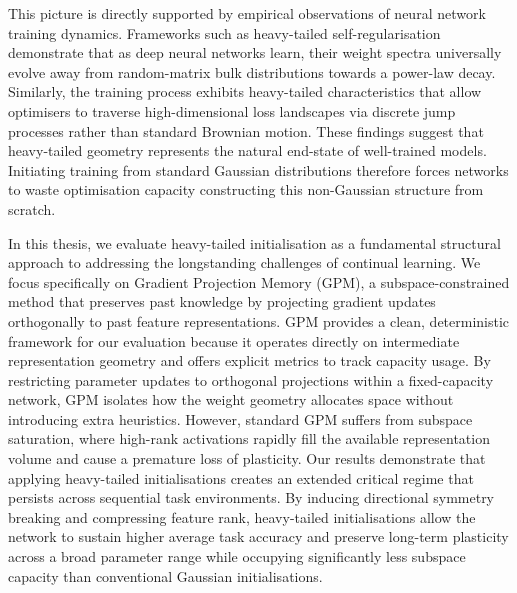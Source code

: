 \documentclass[11pt,oneside]{report}
\begin{document}
This picture is directly supported by empirical observations of neural network training dynamics. Frameworks such as heavy-tailed self-regularisation demonstrate that as deep neural networks learn, their weight spectra universally evolve away from random-matrix bulk distributions towards a power-law decay. Similarly, the training process exhibits heavy-tailed characteristics that allow optimisers to traverse high-dimensional loss landscapes via discrete jump processes rather than standard Brownian motion. These findings suggest that heavy-tailed geometry represents the natural end-state of well-trained models. Initiating training from standard Gaussian distributions therefore forces networks to waste optimisation capacity constructing this non-Gaussian structure from scratch.  

In this thesis, we evaluate heavy-tailed initialisation as a fundamental structural approach to addressing the longstanding challenges of continual learning. We focus specifically on Gradient Projection Memory (GPM), a subspace-constrained method that preserves past knowledge by projecting gradient updates orthogonally to past feature representations. GPM provides a clean, deterministic framework for our evaluation because it operates directly on intermediate representation geometry and offers explicit metrics to track capacity usage. By restricting parameter updates to orthogonal projections within a fixed-capacity network, GPM isolates how the weight geometry allocates space without introducing extra heuristics. However, standard GPM suffers from subspace saturation, where high-rank activations rapidly fill the available representation volume and cause a premature loss of plasticity. Our results demonstrate that applying heavy-tailed initialisations creates an extended critical regime that persists across sequential task environments. By inducing directional symmetry breaking and compressing feature rank, heavy-tailed initialisations allow the network to sustain higher average task accuracy and preserve long-term plasticity across a broad parameter range while occupying significantly less subspace capacity than conventional Gaussian initialisations.  
\end{document}
